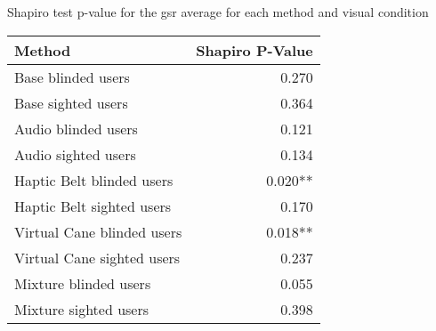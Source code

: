 
\centering
\caption{Shapiro test p-value for the gsr average for each method and visual condition}
\label{tab:shapiro_gsr_avg}
\begin{tabular}{lr}
\toprule
                    Method & Shapiro P-Value \\
\midrule
        Base blinded users &           0.270 \\
        Base sighted users &           0.364 \\
       Audio blinded users &           0.121 \\
       Audio sighted users &           0.134 \\
 Haptic Belt blinded users &         0.020** \\
 Haptic Belt sighted users &           0.170 \\
Virtual Cane blinded users &         0.018** \\
Virtual Cane sighted users &           0.237 \\
     Mixture blinded users &           0.055 \\
     Mixture sighted users &           0.398 \\
\bottomrule
\end{tabular}
